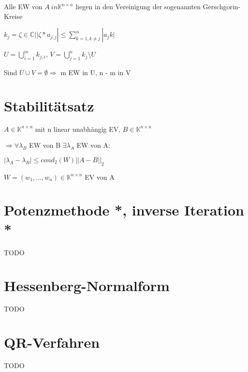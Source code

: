 \documentclass[12pt,a4paper]{article} %
\begin{document}
	Alle EW von $A \ in \mathbb{K}^{n \times n}$ liegen in den Vereinigung der sogenannten Gerschgorin-Kreise
	
	$k_j = {\zeta \in \mathbb{C} | |\zeta * a_{j, j}| \le \sum\limits_{k = 1, k \ne j}^n|a_jk|}$
	
	$U = \bigcup\limits_{i = 1}^mk_{j, i}$, $V = \bigcup\limits_{j = 1}^nk_j \text{\textbackslash} U$
	
	Sind $U \cup V = \emptyset \Rightarrow$ m EW in U, n - m in V
	
	\section{Stabilitätsatz}
	
	$A \in \mathbb{K}^{n \times n}$ mit n linear unabhängig EV, $B \in \mathbb{K}^{n \times n}$
	
	$\Rightarrow \forall \lambda_B$ EW von B $\exists \lambda_A$ EW von A:
	
	$|\lambda_A - \lambda_B| \le cond_2(W) ||A - B||_2$
	
	$W = (w_1, ..., w_n) \in \mathbb{K}^{n \times n}$ EV von A
	
	\section{Potenzmethode *, inverse Iteration *}
	
	TODO
	
	\section{Hessenberg-Normalform}
	
	TODO
	
	\section{QR-Verfahren}
	
	TODO
\end{document}
